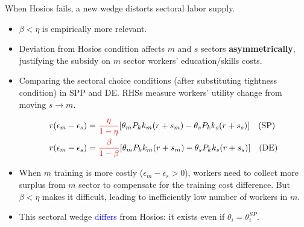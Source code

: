 \documentclass[9pt,xcolor={svgnames}]{beamer}
\begin{document}
\begin{frame}{When Hosios fails, a new wedge distorts sectoral labor supply.}\label{main:beta_eta}


\begin{itemize}


\item $\beta< \eta$ is empirically more relevant. \hyperlink{app:beta_eta}{}


\item Deviation from Hosios condition affects $m$ and $s$ sectors \textbf{asymmetrically},  justifying the subsidy on $m$ sector workers' education/skills costs.\\

\vspace{5mm}




    \item Comparing the sectoral choice conditions (after substituting tightness condition) in SPP and DE. RHSs measure workers' utility change from moving $s \rightarrow m$.


   \begin{align*}
    r(\epsilon_m-\epsilon_s) &= \textcolor{red}{\frac{\eta}{1-\eta}}[\theta_mP_kk_m(r+s_m)-\theta_sP_kk_s(r+s_s)]  \quad (\text{SP}) \label{rc_sp}\\
        r(\epsilon_m-\epsilon_s) &= \textcolor{red}{\frac{\beta}{1-\beta}}[\theta_mP_kk_m(r+s_m)-\theta_sP_kk_s(r+s_s)]  \quad (\text{DE}) \label{rc_de} 
\end{align*}


    \item When $m$ training is more costly ($ \epsilon_m -\epsilon_s >0$), workers need to collect more surplus from $m$ sector to compensate for the training cost difference.  But $\beta<\eta$ makes it difficult, leading to inefficiently low number of workers in $m$.


    \item This sectoral wedge \textcolor{blue}{differs} from Hosios: it exists even if $\theta_i = \theta_i^{SP}$. 
\end{itemize}



\end{frame}
\end{document}

